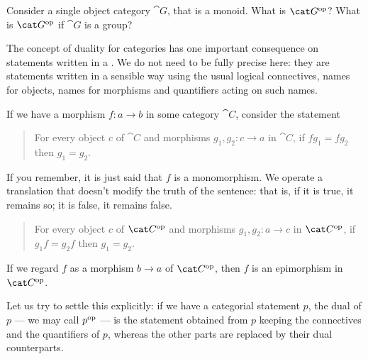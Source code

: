 \begin{exercise}
  Consider a single object category \(\cat G\), that is a monoid. What
  is \(\opcat G\)? What is \(\opcat G\) if \(\cat G\) is a group?
\end{exercise}

The concept of duality for categories has one important consequence on
statements written in a . We do not need to be
fully precise here: they are statements written in a sensible way
using the usual logical connectives, names for objects, names for
morphisms and quantifiers acting on such names.

\begin{example}
  If we have a morphism \(f : a \to b\) in some category \(\cat C\),
  consider the statement
  \begin{quotation}
    For every {\color{red!65!black} object \(c\) of \(\cat C\)} and
    {\color{blue!65!black} morphisms \(g_1, g_2 : c \to a\) in
      \(\cat C\)}, if {\color{green!65!black} \(f g_1 = f g_2\)} then
    {\color{orange!65!black}\(g_1 = g_2\)}.
  \end{quotation}
  If you remember, it is just said that \(f\) is a monomorphism. We
  operate a translation that doesn't modify the truth of the sentence:
  that is, if it is true, it remains so; it is false, it remains
  false.
  \begin{quotation}
    For every {\color{red!65!black} object \(c\) of \(\opcat C\)} and
    {\color{blue!65!black} morphisms \(g_1, g_2 : a \to c\) in
      \(\opcat C\)}, if {\color{green!65!black} \(g_1 f = g_2 f\)}
    then {\color{orange!65!black}\(g_1 = g_2\)}.
  \end{quotation}
  If we regard \(f\) as a morphism \(b \to a\) of \(\opcat C\), then
  \(f\) is an epimorphism in \(\opcat C\).
\end{example}

Let us try to settle this explicitly: if we have a categorial
statement \(p\), the dual of \(p\) --- we may call \(p^\text{op}\) --- is the
statement obtained from \(p\) keeping the connectives and the
quantifiers of \(p\), whereas the other parts are replaced by their
dual counterparts.

\begin{example}
\end{example}

